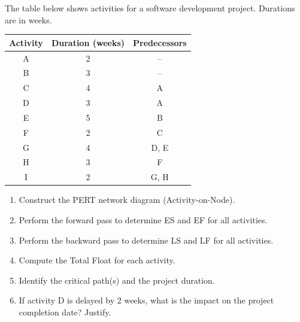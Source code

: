 \documentclass[11pt]{article}
\begin{document}
\begin{exercice}
The table below shows activities for a software development project. Durations are in weeks.
\begin{center}
\begin{tabular}{|c|c|c|}
\hline
Activity & Duration (weeks) & Predecessors \\
\hline
A & 2 & -- \\
B & 3 & -- \\
C & 4 & A \\
D & 3 & A \\
E & 5 & B \\
F & 2 & C \\
G & 4 & D, E \\
H & 3 & F \\
I & 2 & G, H \\
\hline
\end{tabular}
\end{center}
\begin{enumerate}
    \item Construct the PERT network diagram (Activity-on-Node).
    \item Perform the forward pass to determine ES and EF for all activities.
    \item Perform the backward pass to determine LS and LF for all activities.
    \item Compute the Total Float for each activity.
    \item Identify the critical path(s) and the project duration.
    \item If activity D is delayed by 2 weeks, what is the impact on the project completion date? Justify.
\end{enumerate}
\end{exercice}
\end{document}
